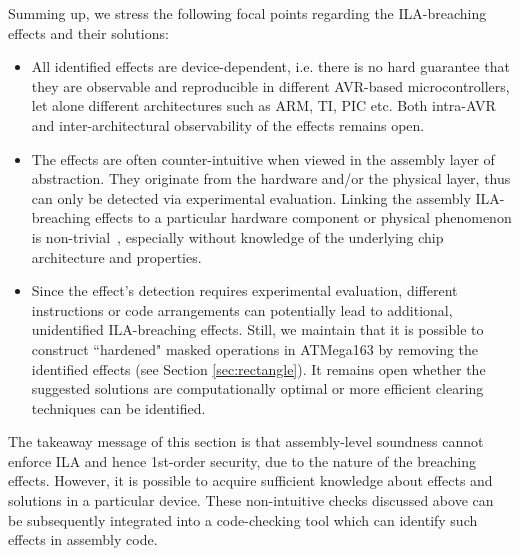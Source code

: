 Summing up, we stress the following focal points regarding the ILA-breaching effects and their solutions:
\begin{itemize}
\item All identified effects are device-dependent, i.e. there is no hard guarantee that they are observable and reproducible in different AVR-based microcontrollers, let alone different architectures such as ARM, TI, PIC etc. Both intra-AVR and inter-architectural observability of the effects remains open.
\item The effects are often counter-intuitive when viewed in the assembly layer of abstraction. They originate from the hardware and/or the physical layer, thus can only be detected via experimental evaluation. Linking the assembly ILA-breaching effects to a particular hardware component or physical phenomenon is non-trivial~\cite{DBLP:conf/eurocrypt/RenauldSVKF11,DBLP:phd/dnb/Stottinger12}, especially without knowledge of the underlying chip architecture and properties.
\item  Since the effect's detection requires experimental evaluation, different instructions or code arrangements can potentially lead to additional, unidentified ILA-breaching effects. Still, we maintain that it is possible to construct ``hardened" masked operations in ATMega163 by removing the identified effects (see Section \ref{sec:rectangle}). It remains open whether the suggested solutions are computationally optimal or more efficient clearing techniques can be identified.
\end{itemize}

The takeaway message of this section is that assembly-level soundness cannot enforce ILA and hence 1st-order security, due to the nature of the breaching effects. However, it is possible to acquire sufficient knowledge about effects and solutions in a particular device. These non-intuitive checks discussed above can be subsequently integrated into a code-checking tool which can identify such effects in assembly code.
